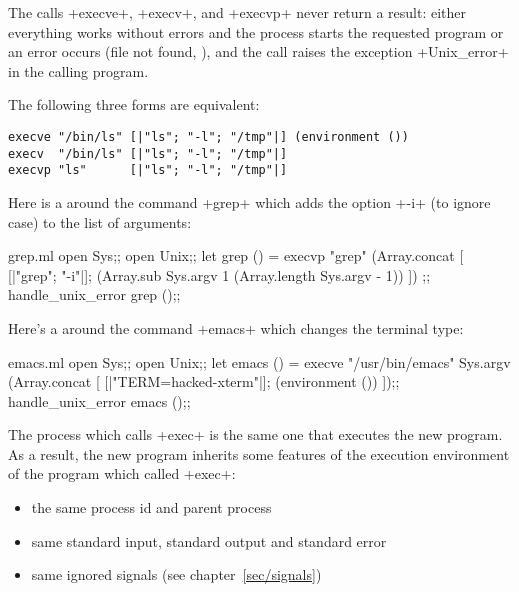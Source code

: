 The calls \ml+execve+, \ml+execv+, and \ml+execvp+ never return a
result: either everything works without errors and the process starts
the requested program or an error occurs (file not found, \etc), and
the call raises the exception \ml+Unix_error+ in the calling program.

\begin{example}
The following three forms are equivalent:
\begin{lstlisting}
execve "/bin/ls" [|"ls"; "-l"; "/tmp"|] (environment ())
execv  "/bin/ls" [|"ls"; "-l"; "/tmp"|]
execvp "ls"      [|"ls"; "-l"; "/tmp"|]
\end{lstlisting}
\end{example}

\begin{example}
Here is a  around the command \ml+grep+ which
adds the option \ml+-i+ (to ignore case) to the list of arguments:
%
\begin{listingcodefile}{grep.ml}
open Sys;;
open Unix;;
let grep () =
 execvp "grep"
   (Array.concat
      [ [|"grep"; "-i"|];
        (Array.sub Sys.argv 1 (Array.length Sys.argv - 1)) ])
;;
handle_unix_error grep ();;
\end{listingcodefile}
\end{example}

\begin{example}
Here's a  around the command \ml+emacs+ which
changes the terminal type:
%
\begin{listingcodefile}{emacs.ml}
open Sys;;
open Unix;;
let emacs () =
 execve "/usr/bin/emacs" Sys.argv
   (Array.concat [ [|"TERM=hacked-xterm"|]; (environment ()) ]);;
handle_unix_error emacs ();;
\end{listingcodefile}
\end{example}

The process which calls \ml+exec+ is the same one that executes the
new program.  As a result, the new program inherits some features of
the execution environment of the program which called \ml+exec+:
\begin{itemize}
\item the same process id and parent process
\item same standard input, standard output and standard error
\item same ignored signals (see chapter~\ref{sec/signals})
\end{itemize}

